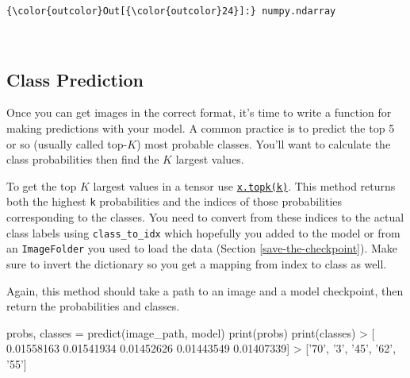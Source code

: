 \documentclass[11pt]{article}
\newenvironment{Shaded}{}{}
\newcommand{\FloatTok}[1]{\textcolor[rgb]{0.25,0.63,0.44}{{#1}}}
\newcommand{\StringTok}[1]{\textcolor[rgb]{0.25,0.44,0.63}{{#1}}}
\newcommand{\NormalTok}[1]{{#1}}
\newcommand{\OperatorTok}[1]{\textcolor[rgb]{0.40,0.40,0.40}{{#1}}}
\newcommand{\BuiltInTok}[1]{{#1}}
\begin{document}
\begin{Verbatim}[commandchars=\\\{\}]
{\color{outcolor}Out[{\color{outcolor}24}]:} numpy.ndarray
\end{Verbatim}
            
    \begin{center}
    \end{center}
    { \hspace*{\fill} \\}
    
    \hypertarget{class-prediction}{%
\subsection{Class Prediction}\label{class-prediction}}

Once you can get images in the correct format, it's time to write a
function for making predictions with your model. A common practice is to
predict the top 5 or so (usually called top-\(K\)) most probable
classes. You'll want to calculate the class probabilities then find the
\(K\) largest values.

To get the top \(K\) largest values in a tensor use
\href{http://pytorch.org/docs/master/torch.html\#torch.topk}{\texttt{x.topk(k)}}.
This method returns both the highest \texttt{k} probabilities and the
indices of those probabilities corresponding to the classes. You need to
convert from these indices to the actual class labels using
\texttt{class\_to\_idx} which hopefully you added to the model or from
an \texttt{ImageFolder} you used to load the data
(Section \ref{save-the-checkpoint}). Make sure to invert the dictionary
so you get a mapping from index to class as well.

Again, this method should take a path to an image and a model
checkpoint, then return the probabilities and classes.

\begin{Shaded}
\begin{Highlighting}[]
\NormalTok{probs, classes }\OperatorTok{=}\NormalTok{ predict(image_path, model)}
\BuiltInTok{print}\NormalTok{(probs)}
\BuiltInTok{print}\NormalTok{(classes)}
\OperatorTok{>}\NormalTok{ [ }\FloatTok{0.01558163}  \FloatTok{0.01541934}  \FloatTok{0.01452626}  \FloatTok{0.01443549}  \FloatTok{0.01407339}\NormalTok{]}
\OperatorTok{>}\NormalTok{ [}\StringTok{'70'}\NormalTok{, }\StringTok{'3'}\NormalTok{, }\StringTok{'45'}\NormalTok{, }\StringTok{'62'}\NormalTok{, }\StringTok{'55'}\NormalTok{]}
\end{Highlighting}
\end{Shaded}
\end{document}
